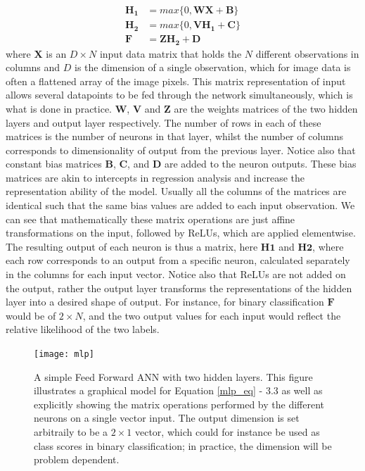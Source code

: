 \documentclass{report}
\begin{document}
\begin{align} \label{mlp_eq}
  \mathbf{H_1} &= max\{0, \mathbf{W}\mathbf{X} + \mathbf{B}\} \\
  \mathbf{H_2} &= max\{0, \mathbf{V}\mathbf{H_1} + \mathbf{C}\} \\ 
  \mathbf{F} &= \mathbf{Z} \mathbf{H_{2}} + \mathbf{D} 
\end{align}
where $\mathbf{X}$ is an $D\times N$ input data matrix that holds the $N$ different observations in columns and $D$ is the dimension of a single observation, which for image data is often a flattened array of the image pixels. This matrix representation of input allows several datapoints to be fed through the network simultaneously, which is what is done in practice. $\mathbf{W}$, $\mathbf{V}$ and $\mathbf{Z}$ are the weights matrices of the two hidden layers and output layer respectively. The number of rows in each of these matrices is the number of neurons in that layer, whilst the number of columns corresponds to dimensionality of output from the previous layer. Notice also that constant bias matrices $\mathbf{B}$, $\mathbf{C}$, and $\mathbf{D}$ are added to the neuron outputs. These bias matrices are akin to intercepts in regression analysis and increase the representation ability of the model. Usually all the columns of the matrices are identical such that the same bias values are added to each input observation. We can see that mathematically these matrix operations are just affine transformations on the input, followed by ReLUs, which are applied elementwise. The resulting output of each neuron is thus a matrix, here $\mathbf{H1}$ and $\mathbf{H2}$, where each row corresponds to an output from a specific neuron, calculated separately in the columns for each input vector. Notice also that ReLUs are not added on the output, rather the output layer transforms the representations of the hidden layer into a desired shape of output. For instance, for binary classification $\mathbf{F}$ would be of $2 \times N$, and the two output values for each input would reflect the relative likelihood of the two labels.

\begin{figure}[h!]
  \centering
	\texttt{[image: mlp]}
	\caption{A simple Feed Forward ANN with two hidden layers. This figure illustrates a graphical model for Equation \ref{mlp_eq} - 3.3 as well as explicitly showing the matrix operations performed by the different neurons on a single vector input. The output dimension is set arbitraily to be a $2\times1$ vector, which could for instance be used as class scores in binary classification; in practice, the dimension will be problem dependent.}
	\label{fig:mlp}
\end{figure}
\end{document}
